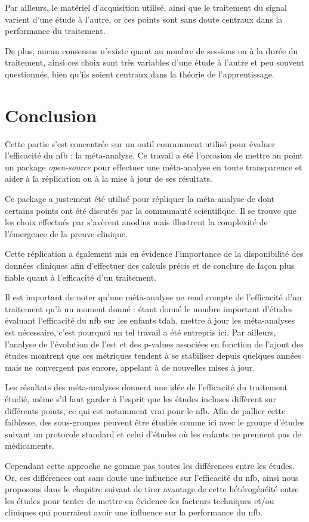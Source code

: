 Par ailleurs, le matériel d'acquisition utilisé, ainsi que le traitement du signal varient d'une étude à l'autre, or ces points sont sans doute centraux 
dans la performance du traitement. 

De plus, aucun consensus n'existe quant au nombre de sessions ou à la durée du traitement, ainsi ces choix sont très variables d'une étude à l'autre et peu
souvent questionnés, bien qu'ils soient centraux dans la théorie de l'apprentissage.

\section{Conclusion}

Cette partie s'est concentrée sur un outil couramment utilisé pour évaluer l'efficacité du \gls{nfb} : la méta-analyse. Ce travail a été l'occasion de mettre au point un package 
\textsl{open-source} pour effectuer une méta-analyse en toute transparence et aider à la réplication ou à la mise à jour de ses résultats.

Ce package a justement été utilisé pour répliquer la méta-analyse de \citet{Cortese2016} dont certains points ont été discutés par la communauté scientifique. 
Il se trouve que les choix effectués par \citet{Cortese2016} s'avèrent anodins mais illustrent la complexité de l'émergence de la preuve
clinique.

Cette réplication a également mis en évidence l'importance de la disponibilité des données cliniques afin d'effectuer des calculs précis et de conclure de façon
plus fiable quant à l'efficacité d'un traitement. 

Il est important de noter qu'une méta-analyse ne rend compte de l'efficacité d'un traitement qu'à un moment donné : étant donné le nombre important d'études évaluant l'efficacité du \gls{nfb} 
sur les enfants \gls{tdah}, mettre à jour les méta-analyses est nécessaire, c'est pourquoi un tel travail a été entrepris ici. Par ailleurs, l'analyse de l'évolution de l'\gls{est} et des p-values 
associées en fonction de l'ajout des études montrent que ces métriques tendent à se stabiliser depuis quelques années mais ne convergent pas encore, appelant à de nouvelles mises à jour.  

Les résultats des méta-analyses donnent une idée de l'efficacité du traitement étudié, même s'il faut garder à l'esprit que les études incluses
diffèrent sur différents points, ce qui est notamment vrai pour le \gls{nfb}. Afin de pallier cette faiblesse, des sous-groupes peuvent être étudiés comme ici avec le groupe d'études
suivant un protocole standard et celui d'études où les enfants ne prennent pas de médicaments.

Cependant cette approche ne gomme pas toutes les différences entre les études. Or, ces différences ont sans doute une influence sur l'efficacité du \gls{nfb}, ainsi nous proposons dans le chapitre 
suivant de tirer avantage de cette hétérogénéité entre les études pour tenter de mettre en évidence les facteurs techniques et/ou cliniques qui pourraient avoir une influence sur la performance du \gls{nfb}.

  